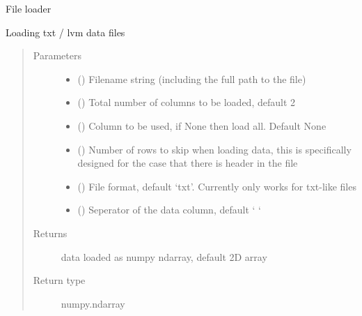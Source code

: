 \documentclass[letterpaper,10pt,english]{sphinxmanual}
\begin{document}
\begin{fulllineitems}
\label{\detokenize{scibeam.core:scibeam.core.common.loadFile}}
File loader

Loading txt / lvm data files
\begin{quote}\begin{description}
\item[{Parameters}] \leavevmode\begin{itemize}
\item {} 
 () \textendash{} Filename string (including the full path to the file)

\item {} 
 () \textendash{} Total number of columns to be loaded, default 2

\item {} 
 () \textendash{} Column to be used, if None then load all. Default None

\item {} 
 () \textendash{} Number of rows to skip when loading data, this is specifically designed
for the case that there is header in the file

\item {} 
 () \textendash{} File format, default ‘txt’.
Currently only works for txt-like files

\item {} 
 () \textendash{} Seperator of the data column, default ‘ ‘

\end{itemize}

\item[{Returns}] \leavevmode
data loaded as numpy ndarray, default 2D array

\item[{Return type}] \leavevmode
numpy.ndarray


\end{description}
\end{quote}
\end{fulllineitems}
\end{document}

